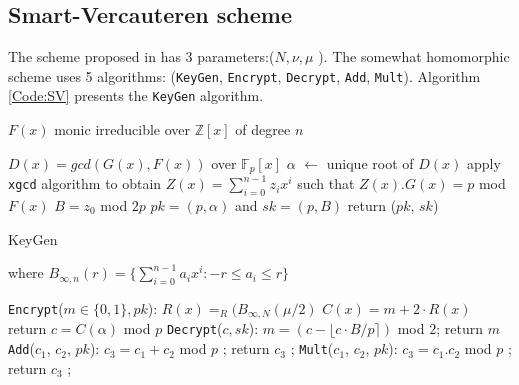 \documentclass{acm_proc_article-sp}
\begin{document}
\subsection{Smart-Vercauteren  scheme}

The scheme proposed in \cite{cryptoeprint:2009:571} has 3 parameters:($N, \nu, \mu$ ). The somewhat homomorphic scheme uses 5 algorithms: (\texttt{KeyGen}, \texttt{Encrypt}, \texttt{Decrypt}, \texttt{Add}, \texttt{Mult}). Algorithm \autoref{Code:SV} presents the \texttt{KeyGen} algorithm.

\linesnumbered
\begin{algorithm}[H]
 \SetVline
 $F(x)$ monic irreducible over $\mathbb{Z}[x]$ of degree $n$\;

$D(x)=gcd(G(x),F(x))$ over $\mathbb{F}_p[x]$\;
$\alpha$ $\leftarrow$ unique root of $D(x)$\;
apply \texttt{xgcd} algorithm to obtain $Z(x) = \sum_{i=0}^{n-1}{z_ix^i} $  such that $Z(x).G(x)=p$ mod $F(x)$\;
$B=z_0$ mod $2p$\;
$pk = (p, \alpha)$ and $sk = (p , B)$\;
return ($pk$, $sk$)\;
\caption{KeyGen\label{Code:SV}}
\end{algorithm}

where $ B_{\infty , n}(r) = \{\sum_{i=0}^{n-1}{a_i}x^i : -r \leq a_i \leq r \} $

\texttt{Encrypt}($m \in \{0,1\} , pk$): 
\newline \phantom{x}\hspace{3ex}  $R(x)=_{R}(B_{\infty , N}(\mu/2)$
 \; $C(x)=m+2\cdot R(x)$ 
\newline \phantom{x}\hspace{3ex} return  $c=C(\alpha)$ mod $p$
\newline \texttt{Decrypt}($c, sk$):
\newline \phantom{x}\hspace{3ex} $m = (c - \lfloor c \cdot B/p \rceil )$ mod $2$;
\phantom{x}\hspace{1ex} return $m$
\newline \texttt{Add}($c_1$, $c_2$, $pk$):
\newline \phantom{x}\hspace{3ex} $c_3=c_1+c_2$ mod $p$
;  \phantom{x}\hspace{1ex}  return $c_3$
;
\newline \texttt{Mult}($c_1$, $c_2$, $pk$):
 \newline \phantom{x}\hspace{3ex}  $c_3=c_1.c_2$ mod $p$
 ; \phantom{x}\hspace{1ex}  return $c_3$
;
\end{document}
